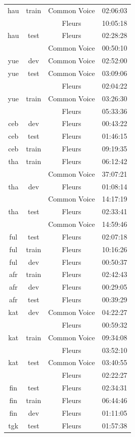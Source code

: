 \begin{longtable}{cccc}
hau & train & Common Voice & 02:06:03 \\ 
 & & Fleurs & 10:05:18 \\ 
hau & test & Fleurs & 02:28:28 \\ 
 & & Common Voice & 00:50:10 \\ \midrule
yue & dev & Common Voice & 02:52:00 \\ 
yue & test & Common Voice & 03:09:06 \\ 
 & & Fleurs & 02:04:22 \\ 
yue & train & Common Voice & 03:26:30 \\ 
 & & Fleurs & 05:33:36 \\ \midrule
ceb & dev & Fleurs & 00:43:22 \\ 
ceb & test & Fleurs & 01:46:15 \\ 
ceb & train & Fleurs & 09:19:35 \\ \midrule
tha & train & Fleurs & 06:12:42 \\ 
 & & Common Voice & 37:07:21 \\ 
tha & dev & Fleurs & 01:08:14 \\ 
 & & Common Voice & 14:17:19 \\ 
tha & test & Fleurs & 02:33:41 \\ 
 & & Common Voice & 14:59:46 \\ \midrule
ful & test & Fleurs & 02:07:18 \\ 
ful & train & Fleurs & 10:16:26 \\ 
ful & dev & Fleurs & 00:50:37 \\ \midrule
afr & train & Fleurs & 02:42:43 \\ 
afr & dev & Fleurs & 00:29:05 \\ 
afr & test & Fleurs & 00:39:29 \\ \midrule
kat & dev & Common Voice & 04:22:27 \\ 
 & & Fleurs & 00:59:32 \\ 
kat & train & Common Voice & 09:34:08 \\ 
 & & Fleurs & 03:52:10 \\ 
kat & test & Common Voice & 03:40:55 \\ 
 & & Fleurs & 02:22:27 \\ \midrule
fin & test & Fleurs & 02:34:31 \\ 
fin & train & Fleurs & 06:44:46 \\ 
fin & dev & Fleurs & 01:11:05 \\ \midrule
tgk & test & Fleurs & 01:57:38 \\ 

\end{longtable}
